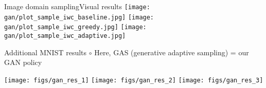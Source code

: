 \begin{frame}{Image domain sampling}{Visual results}
    \centering
    \texttt{[image: gan/plot\_sample\_iwc\_baseline.jpg]}
    \texttt{[image: gan/plot\_sample\_iwc\_greedy.jpg]}    
    \texttt{[image: gan/plot\_sample\_iwc\_adaptive.jpg]}

\end{frame}

\begin{frame}{Additional MNIST results}
    $\circ$ Here, GAS (generative adaptive sampling) = our GAN policy
    \vfill
        \begin{center}
            
        
        \texttt{[image: figs/gan\_res\_1]}%
        \hfill
        \texttt{[image: figs/gan\_res\_2]}%
        \hfill
        \texttt{[image: figs/gan\_res\_3]}%
    \end{center}

\end{frame}

